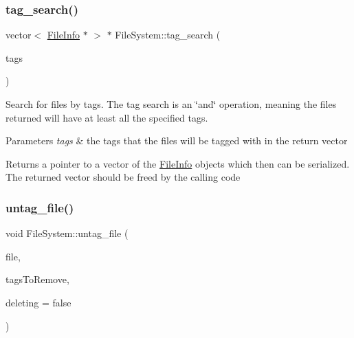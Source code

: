 \subsubsection{\texorpdfstring{tag\+\_\+search()}{tag\_search()}}
{\footnotesize\ttfamily vector$<$ \mbox{\hyperlink{class_file_info}{File\+Info}} $\ast$ $>$ $\ast$ File\+System\+::tag\+\_\+search (\begin{DoxyParamCaption}\item[{unordered\+\_\+set$<$ string $>$ \&}]{tags }\end{DoxyParamCaption})}

Search for files by tags. The tag search is an \char`\"{}and\char`\"{} operation, meaning the files returned will have at least all the specified tags. 
\begin{DoxyParams}{Parameters}
{\em tags} & the tags that the files will be tagged with in the return vector \\
\hline
\end{DoxyParams}
\begin{DoxyReturn}{Returns}
a pointer to a vector of the \mbox{\hyperlink{class_file_info}{File\+Info}} objects which then can be serialized. The returned vector should be freed by the calling code 
\end{DoxyReturn}
\mbox{\label{class_file_system_ac41a4071cfd0f4470f606e24c04740b7}} 
\subsubsection{\texorpdfstring{untag\+\_\+file()}{untag\_file()}\hspace{0.1cm}{\footnotesize\ttfamily [1/2]}}
{\footnotesize\ttfamily void File\+System\+::untag\+\_\+file (\begin{DoxyParamCaption}\item[{\mbox{\hyperlink{class_file_info}{File\+Info}} $\ast$}]{file,  }\item[{unordered\+\_\+set$<$ string $>$}]{tags\+To\+Remove,  }\item[{bool}]{deleting = {\ttfamily false} }\end{DoxyParamCaption})}

